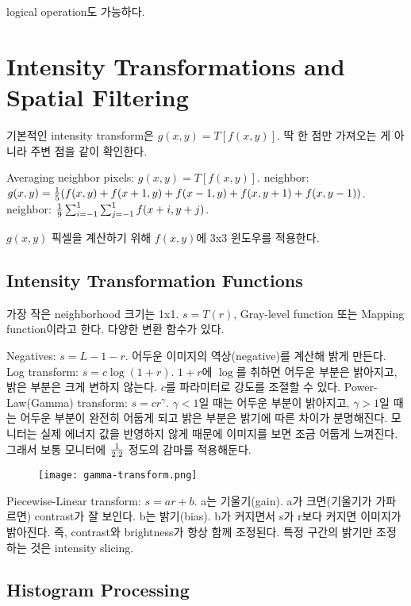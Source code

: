 logical operation도 가능하다.

\section{Intensity Transformations and Spatial Filtering}

기본적인 intensity transform은 $g(x, y) = T[f(x, y)]$. 딱 한 점만 가져오는 게 아니라 주변 점을 같이 확인한다.

\bitmz
  \itm Averaging neighbor pixels: $g(x, y) = T[f(x, y)]$.
   neighbor: $g(x, y) = {1 \over 5} (f(x, y) + f(x + 1, y) + f(x - 1, y) + f(x, y + 1) + f(x, y - 1))$.
   neighbor: ${1 \over 9} \sum_{i=-1}^1 \sum_{j=-1}^1 f(x + i, y + j)$.
\eitmz

$g(x, y)$ 픽셀을 계산하기 위해 $f(x, y)$에 3x3 윈도우를 적용한다.

\subsection{Intensity Transformation Functions}

가장 작은 neighborhood 크기는 1x1. $s = T(r)$, Gray-level function 또는 Mapping function이라고 한다. 다양한 변환 함수가 있다.

\bitmz
  \itm Negatives: $s = L - 1 - r$. 어두운 이미지의 역상(negative)를 계산해 밝게 만든다.
  \itm Log transform: $s = c\log(1 + r)$. $1 + r$에 $\log$를 취하면 어두운 부분은 밝아지고, 밝은 부분은 크게 변하지 않는다. $c$를 파라미터로 강도를 조절할 수 있다.
  \itm Power-Law(Gamma) transform: $s = cr^\gamma$. $\gamma < 1$일 때는 어두운 부분이 밝아지고, $\gamma > 1$일 때는 어두운 부분이 완전히 어둡게 되고 밝은 부분은 밝기에 따른 차이가 분명해진다. 모니터는 실제 에너지 값을 반영하지 않게 때문에 이미지를 보면 조금 어둡게 느껴진다. 그래서 보통 모니터에 $1 \over 2.2$ 정도의 감마를 적용해둔다. \begin{figure}[h] \centering \texttt{[image: gamma-transform.png]} \end{figure}
    \itm Piecewise-Linear transform: $s = ar + b$. a는 기울기(gain). a가 크면(기울기가 가파르면) contrast가 잘 보인다. b는 밝기(bias). b가 커지면서 s가 r보다 커지면 이미지가 밝아진다. 즉, contrast와 brightness가 항상 함께 조정된다. 특정 구간의 밝기만 조정하는 것은 intensity slicing.
\eitmz

\subsection{Histogram Processing}

